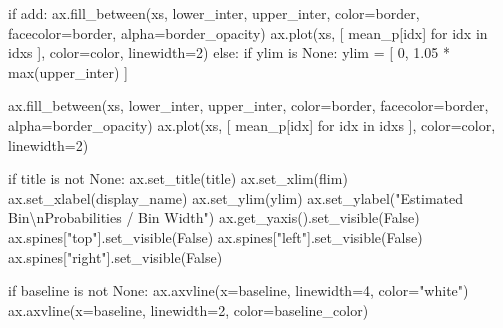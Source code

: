 \documentclass[
  letterpaper,
  DIV=11,
  numbers=noendperiod]{scrartcl}
\newenvironment{Shaded}{\begin{snugshade}}{\end{snugshade}}
\newcommand{\BuiltInTok}[1]{\textcolor[rgb]{0.00,0.23,0.31}{#1}}
\newcommand{\CharTok}[1]{\textcolor[rgb]{0.13,0.47,0.30}{#1}}
\newcommand{\ControlFlowTok}[1]{\textcolor[rgb]{0.00,0.23,0.31}{#1}}
\newcommand{\DecValTok}[1]{\textcolor[rgb]{0.68,0.00,0.00}{#1}}
\newcommand{\FloatTok}[1]{\textcolor[rgb]{0.68,0.00,0.00}{#1}}
\newcommand{\KeywordTok}[1]{\textcolor[rgb]{0.00,0.23,0.31}{#1}}
\newcommand{\NormalTok}[1]{\textcolor[rgb]{0.00,0.23,0.31}{#1}}
\newcommand{\OperatorTok}[1]{\textcolor[rgb]{0.37,0.37,0.37}{#1}}
\newcommand{\StringTok}[1]{\textcolor[rgb]{0.13,0.47,0.30}{#1}}
\newcommand{\VariableTok}[1]{\textcolor[rgb]{0.07,0.07,0.07}{#1}}
\begin{document}
\begin{Shaded}
\begin{Highlighting}[]
  \ControlFlowTok{if}\NormalTok{ add:}
\NormalTok{    ax.fill\_between(xs, lower\_inter, upper\_inter,}
\NormalTok{                    color}\OperatorTok{=}\NormalTok{border, facecolor}\OperatorTok{=}\NormalTok{border,}
\NormalTok{                    alpha}\OperatorTok{=}\NormalTok{border\_opacity)}
\NormalTok{    ax.plot(xs, [ mean\_p[idx] }\ControlFlowTok{for}\NormalTok{ idx }\KeywordTok{in}\NormalTok{ idxs ],}
\NormalTok{            color}\OperatorTok{=}\NormalTok{color, linewidth}\OperatorTok{=}\DecValTok{2}\NormalTok{)}
  \ControlFlowTok{else}\NormalTok{:}
    \ControlFlowTok{if}\NormalTok{ ylim }\KeywordTok{is} \VariableTok{None}\NormalTok{:}
\NormalTok{      ylim }\OperatorTok{=}\NormalTok{ [ }\DecValTok{0}\NormalTok{, }\FloatTok{1.05} \OperatorTok{*} \BuiltInTok{max}\NormalTok{(upper\_inter) ]}

\NormalTok{    ax.fill\_between(xs, lower\_inter, upper\_inter,}
\NormalTok{                    color}\OperatorTok{=}\NormalTok{border, facecolor}\OperatorTok{=}\NormalTok{border,}
\NormalTok{                    alpha}\OperatorTok{=}\NormalTok{border\_opacity)}
\NormalTok{    ax.plot(xs, [ mean\_p[idx] }\ControlFlowTok{for}\NormalTok{ idx }\KeywordTok{in}\NormalTok{ idxs ],}
\NormalTok{            color}\OperatorTok{=}\NormalTok{color, linewidth}\OperatorTok{=}\DecValTok{2}\NormalTok{)}

    \ControlFlowTok{if}\NormalTok{ title }\KeywordTok{is} \KeywordTok{not} \VariableTok{None}\NormalTok{:}
\NormalTok{      ax.set\_title(title)}
\NormalTok{    ax.set\_xlim(flim)}
\NormalTok{    ax.set\_xlabel(display\_name)}
\NormalTok{    ax.set\_ylim(ylim)}
\NormalTok{    ax.set\_ylabel(}\StringTok{"Estimated Bin}\CharTok{\textbackslash{}n}\StringTok{Probabilities / Bin Width"}\NormalTok{)}
\NormalTok{    ax.get\_yaxis().set\_visible(}\VariableTok{False}\NormalTok{)}
\NormalTok{    ax.spines[}\StringTok{"top"}\NormalTok{].set\_visible(}\VariableTok{False}\NormalTok{)}
\NormalTok{    ax.spines[}\StringTok{"left"}\NormalTok{].set\_visible(}\VariableTok{False}\NormalTok{)}
\NormalTok{    ax.spines[}\StringTok{"right"}\NormalTok{].set\_visible(}\VariableTok{False}\NormalTok{)}

  \ControlFlowTok{if}\NormalTok{ baseline }\KeywordTok{is} \KeywordTok{not} \VariableTok{None}\NormalTok{:}
\NormalTok{    ax.axvline(x}\OperatorTok{=}\NormalTok{baseline, linewidth}\OperatorTok{=}\DecValTok{4}\NormalTok{, color}\OperatorTok{=}\StringTok{"white"}\NormalTok{)}
\NormalTok{    ax.axvline(x}\OperatorTok{=}\NormalTok{baseline, linewidth}\OperatorTok{=}\DecValTok{2}\NormalTok{, color}\OperatorTok{=}\NormalTok{baseline\_color)}

\end{Highlighting}
\end{Shaded}
\end{document}
